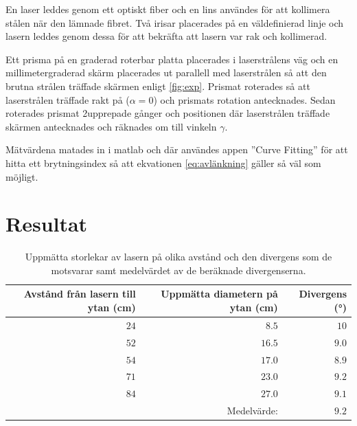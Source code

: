 \documentclass[a4paper]{article}
\begin{document}
  En laser leddes genom ett optiskt fiber och en lins användes för att kollimera stålen när den lämnade fibret. Två irisar placerades på en väldefinierad linje och lasern leddes genom dessa för att bekräfta att lasern var rak och kollimerad.
  
  Ett prisma på en graderad roterbar platta placerades i laserstrålens väg och en millimetergraderad skärm placerades ut parallell med laserstrålen så att den brutna strålen träffade skärmen enligt \autoref{fig:exp}. Prismat roterades så att laserstrålen träffade rakt på ($\alpha=0$) och prismats rotation antecknades. Sedan roterades prismat 2\textdegree upprepade gånger och positionen där laserstrålen träffade skärmen antecknades och räknades om till vinkeln $\gamma$.
  
  Mätvärdena matades in i matlab och där användes appen ”Curve Fitting” för att hitta ett brytningsindex så att ekvationen \eqref{eq:avlänkning} gäller så väl som möjligt.

\section{Resultat}

\FloatBarrier

\begin{table}[h]
	\centering
	\caption{Uppmätta storlekar av lasern på olika avstånd och den divergens som de motsvarar samt medelvärdet av de beräknade divergenserna.}
	\label{tab:div}
	\begin{tabular}{rrr}%
		\hline
		Avstånd från lasern till ytan (cm) & Uppmätta diametern på ytan (cm) & Divergens (°) \\
		\hline
		$24$ & $8.5$ & $10$ \\
		$52$ & $16.5$ & $9.0$ \\
		$54$ & $17.0$ & $8.9$ \\
		$71$ & $23.0$ & $9.2$ \\
		$84$ & $27.0$ & $9.1$ \\
		& Medelvärde: & $9.2$ \\
		\hline
	\end{tabular}
\end{table}
\end{document}
